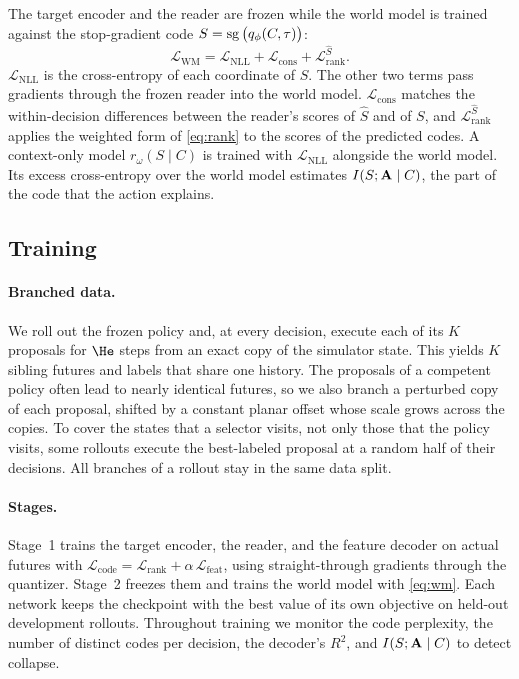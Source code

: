 The target encoder and the reader are frozen while the world model is trained against the stop-gradient code $S=\operatorname{sg}\big(q_\phi(C,\tau)\big)$:
\begin{equation}
  \mathcal{L}_{\mathrm{WM}}=\mathcal{L}_{\mathrm{NLL}}+\mathcal{L}_{\mathrm{cons}}+\mathcal{L}^{\hat S}_{\mathrm{rank}}.
  \label{eq:wm}
\end{equation}
$\mathcal{L}_{\mathrm{NLL}}$ is the cross-entropy of each coordinate of $S$.
The other two terms pass gradients through the frozen reader into the world model.
$\mathcal{L}_{\mathrm{cons}}$ matches the within-decision differences between the reader's scores of $\hat S$ and of $S$, and $\mathcal{L}^{\hat S}_{\mathrm{rank}}$ applies the weighted form of \eqref{eq:rank} to the scores of the predicted codes.
A context-only model $r_\omega(S\mid C)$ is trained with $\mathcal{L}_{\mathrm{NLL}}$ alongside the world model.
Its excess cross-entropy over the world model estimates $I(S;\mathbf{A}\mid C)$, the part of the code that the action explains.

\subsection{Training}
\label{sec:codesign}

\paragraph{Branched data.}
We roll out the frozen policy and, at every decision, execute each of its $K$ proposals for $\He$ steps from an exact copy of the simulator state.
This yields $K$ sibling futures and labels that share one history.
The proposals of a competent policy often lead to nearly identical futures, so we also branch a perturbed copy of each proposal, shifted by a constant planar offset whose scale grows across the copies.
To cover the states that a selector visits, not only those that the policy visits, some rollouts execute the best-labeled proposal at a random half of their decisions.
All branches of a rollout stay in the same data split.

\paragraph{Stages.}
Stage~1 trains the target encoder, the reader, and the feature decoder on actual futures with $\mathcal{L}_{\mathrm{code}}=\mathcal{L}_{\mathrm{rank}}+\alpha\,\mathcal{L}_{\mathrm{feat}}$, using straight-through gradients through the quantizer.
Stage~2 freezes them and trains the world model with \eqref{eq:wm}.
Each network keeps the checkpoint with the best value of its own objective on held-out development rollouts.
Throughout training we monitor the code perplexity, the number of distinct codes per decision, the decoder's $R^2$, and $I(S;\mathbf{A}\mid C)$ to detect collapse.

